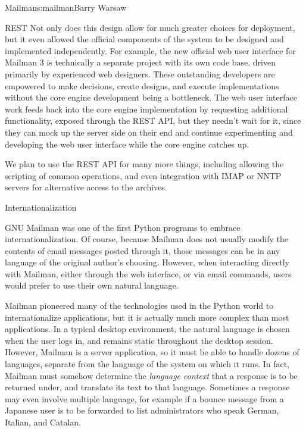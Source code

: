 \begin{aosachapter}{Mailman}{s:mailman}{Barry Warsaw}
\begin{aosasect1}{REST}
Not only does this design allow for much greater choices for
deployment, but it even allowed the official components of the system
to be designed and implemented independently.  For example, the new
official web user interface for Mailman 3 is technically a separate
project with its own code base, driven primarily by experienced web
designers.  These outstanding developers are empowered to make
decisions, create designs, and execute implementations without the
core engine development being a bottleneck.  The web user interface
work feeds back into the core engine implementation by requesting
additional functionality, exposed through the REST API, but they
needn't wait for it, since they can mock up the server side on their
end and continue experimenting and developing the web user interface
while the core engine catches up.

We plan to use the REST API for many more things, including allowing
the scripting of common operations, and even integration with IMAP or
NNTP servers for alternative access to the archives.

\end{aosasect1}

\begin{aosasect1}{Internationalization}

GNU Mailman was one of the first Python programs to embrace
internationalization.  Of course, because Mailman does not usually
modify the contents of email messages posted through it, those
messages can be in any language of the original author's choosing.
However, when interacting directly with Mailman, either through the
web interface, or via email commands, users would prefer to use their
own natural language.

Mailman pioneered many of the technologies used in the Python world to
internationalize applications, but it is actually much more complex
than most applications.  In a typical desktop environment, the natural
language is chosen when the user logs in, and remains static
throughout the desktop session.  However, Mailman is a server
application, so it must be able to handle dozens of languages,
separate from the language of the system on which it runs.  In fact,
Mailman must somehow determine the \emph{language context} that a
response is to be returned under, and translate its text to that
language.  Sometimes a response may even involve multiple language,
for example if a bounce message from a Japanese user is to be
forwarded to list administrators who speak German, Italian, and
Catalan.


\end{aosasect1}
\end{aosachapter}
